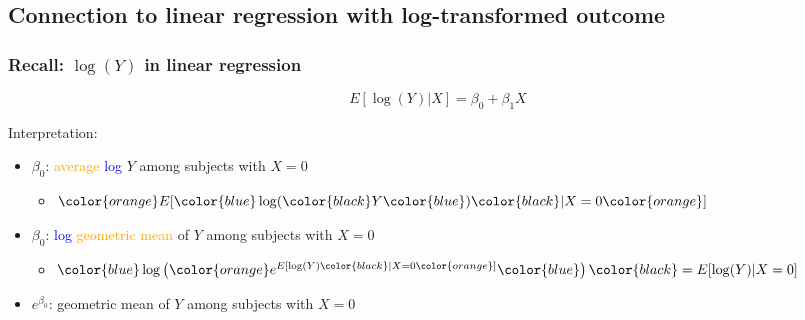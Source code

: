 \documentclass[12pt, 
hyperref={colorlinks=true, linkcolor=blue, urlcolor=cyan}]{beamer}
\begin{document}
\subsection{Connection to linear regression with log-transformed outcome}
\begin{frame}
\frametitle{Recall: $\log(Y)$ in linear regression}
$$E[\log(Y)|X] = \beta_0 + \beta_1 X$$

\color{blue} Interpretation: \color{black}
\begin{itemize} 
\item $\beta_0$: \textcolor{orange}{average} \textcolor{blue}{log} $Y$ among subjects with $X = 0$
	\begin{itemize}
	\item[] $\color{orange}E[ \color{blue}\log(\color{black}Y\color{blue})\color{black}|X=0\color{orange}]$
	\end{itemize} \pause
\item $\beta_0$: \textcolor{blue}{log} \textcolor{orange}{geometric mean} of $Y$ among subjects with $X = 0$
	\begin{itemize}
	\item[] $\color{blue}\log\left(\color{orange} e^{E[\log(Y)\color{black}|X=0\color{orange}]}\color{blue}\right) \color{black} = E[\log(Y)|X=0]$
	\end{itemize} \pause
\item $e^{\beta_0}$: geometric mean of $Y$ among subjects with $X = 0$
\end{itemize}
\end{frame}
\end{document}
